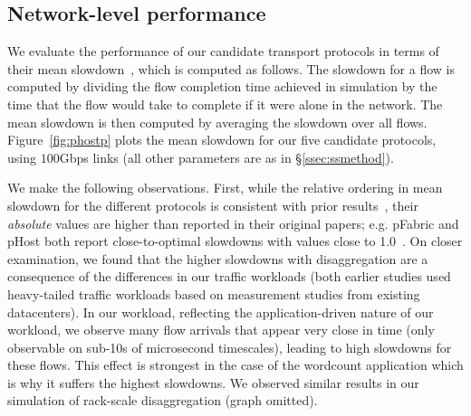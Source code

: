 \subsection{Network-level performance}
\label{ssec:nlp}
\vspace{-0.05in}
We evaluate the performance of our candidate transport protocols in terms of their  mean slowdown~\cite{pfabric}, which is computed as follows. The slowdown for a flow is computed by dividing the flow completion time achieved in simulation by the time that the flow would take to complete if it were alone in the network. The mean slowdown is then computed by averaging the slowdown over all flows.
Figure~\ref{fig:phostp} plots the mean slowdown for our five candidate protocols, using $100$Gbps links (all other parameters are as in \S\ref{ssec:ssmethod}). 

We make the following observations. 
First, while the relative ordering in mean slowdown for the different protocols is consistent with prior results~\cite{phost}, their \emph{absolute} values are higher than reported 
in their original papers; e.g. pFabric and pHost both report close-to-optimal slowdowns with values close to 1.0~\cite{phost,pfabric}. 
On closer examination, we found that the higher slowdowns with disaggregation are a consequence of the differences in our traffic workloads (both earlier studies used heavy-tailed traffic workloads based on measurement 
studies from existing datacenters). In our \dis workload, reflecting the 
application-driven nature of our workload, we observe many flow arrivals that 
appear very close in time (only observable on sub-10s of microsecond timescales), leading to high slowdowns for these flows. This effect is strongest in the case of the wordcount application which is why it suffers the highest slowdowns. 
We observed similar results in our simulation of rack-scale disaggregation (graph omitted).


